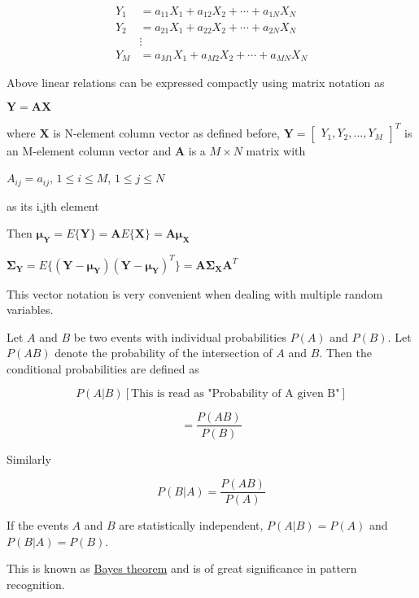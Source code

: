 \documentclass[fleqn]{article}
\begin{document}
	\begin{equation*}
		\begin{aligned}
			Y_1 &= a_{11}X_1 + a_{12}X_2 + \cdots + a_{1N}X_N \\
			Y_2 &= a_{21}X_1 + a_{22}X_2 + \cdots + a_{2N}X_N \\
			&\vdots \\
			Y_M &= a_{M1}X_1 + a_{M2}X_2 + \cdots + a_{MN}X_N
		\end{aligned}
	\end{equation*}
	
	Above linear relations can be expressed compactly using matrix notation as
	
	$\mathbf{Y} = \mathbf{AX}$
	
	where $\mathbf{X}$ is N-element column vector as defined before, $\mathbf{Y} = \begin{bmatrix}Y_1,Y_2,...,Y_M\end{bmatrix}^T$ is an M-element column vector and $\mathbf{A}$ is a $M \times N$ matrix with
	
	$A_{ij} = a_{ij}$, $1 \leq i \leq M$, $1 \leq j \leq N$
	
	as its i,jth element
	
	Then $\mathbf{\boldsymbol{\mu}_Y} = E\{\mathbf{Y}\} = \mathbf{A}E\{\mathbf{X}\} = \mathbf{A}\mathbf{\boldsymbol{\mu}_X}$
	
	$\mathbf{\Sigma_Y} = E\{(\mathbf{Y} - \mathbf{\boldsymbol{\mu}_Y})(\mathbf{Y} - \mathbf{\boldsymbol{\mu}_Y})^T\} = \mathbf{A}\mathbf{\Sigma_X}\mathbf{A}^T$
	
	This vector notation is very convenient when dealing with multiple random variables.
	
	Let $A$ and $B$ be two events with individual probabilities $P(A)$ and $P(B)$. Let $P(AB)$ denote the probability of the intersection of $A$ and $B$. Then the conditional probabilities are defined as
	
	\begin{equation*}
		P(A|B) \left[\text{This is read as "Probability of A given B"}\right]
	\end{equation*}
	
	\begin{equation*}
		= \frac{P(AB)}{P(B)}
	\end{equation*}
	
	Similarly
	
	\begin{equation*}
		P(B|A) = \frac{P(AB)}{P(A)}
	\end{equation*}
	
	If the events $A$ and $B$ are statistically independent, $P(A|B) = P(A)$ and $P(B|A) = P(B)$.
	
	This is known as \underline{Bayes theorem} and is of great significance in pattern recognition.
\end{document}
